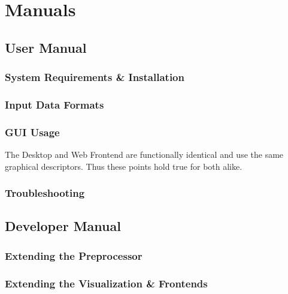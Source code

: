 
\chapter{Manuals}
\label{cha:manuals}

\section{User Manual}
\label{sec:user-manual}

\subsection{System Requirements \& Installation}
\label{sec:system-requirements}

\subsection{Input Data Formats}
\label{sec:input-data-formats}

\subsection{GUI Usage}
\label{sec:gui-usage}

The Desktop and Web Frontend are functionally identical and use the same
graphical descriptors. Thus these points hold true for both alike.

\subsection{Troubleshooting}
\label{sec:troubleshooting}


\section{Developer Manual}
\label{sec:developer-manual}

\subsection{Extending the Preprocessor}
\label{sec:extend-prepr}

\subsection{Extending the Visualization \& Frontends}
\label{sec:extend-visu-}






